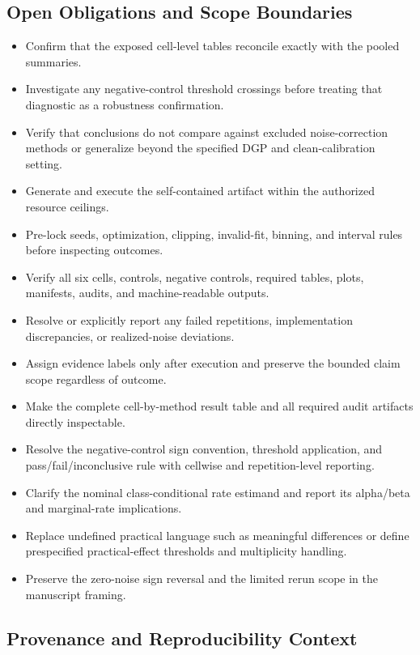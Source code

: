 \documentclass{article}
\begin{document}
\subsection*{Open Obligations and Scope Boundaries}
\begin{itemize}
\item Confirm that the exposed cell-level tables reconcile exactly with the pooled summaries.
\item Investigate any negative-control threshold crossings before treating that diagnostic as a robustness confirmation.
\item Verify that conclusions do not compare against excluded noise-correction methods or generalize beyond the specified DGP and clean-calibration setting.
\item Generate and execute the self-contained artifact within the authorized resource ceilings.
\item Pre-lock seeds, optimization, clipping, invalid-fit, binning, and interval rules before inspecting outcomes.
\item Verify all six cells, controls, negative controls, required tables, plots, manifests, audits, and machine-readable outputs.
\item Resolve or explicitly report any failed repetitions, implementation discrepancies, or realized-noise deviations.
\item Assign evidence labels only after execution and preserve the bounded claim scope regardless of outcome.
\item Make the complete cell-by-method result table and all required audit artifacts directly inspectable.
\item Resolve the negative-control sign convention, threshold application, and pass/fail/inconclusive rule with cellwise and repetition-level reporting.
\item Clarify the nominal class-conditional rate estimand and report its alpha/beta and marginal-rate implications.
\item Replace undefined practical language such as meaningful differences or define prespecified practical-effect thresholds and multiplicity handling.
\item Preserve the zero-noise sign reversal and the limited rerun scope in the manuscript framing.
\end{itemize}
\subsection*{Provenance and Reproducibility Context}
\end{document}
